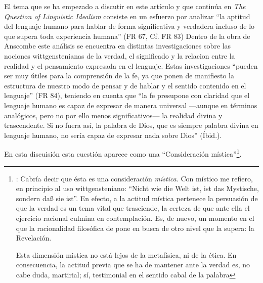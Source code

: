 El tema que se ha empezado a discutir en este artículo y que continúa en \emph{The Question of Linguistic Idealism} consiste en un esfuerzo por analizar \enquote{la aptitud del lenguaje humano para hablar de forma significativa y verdadera incluso de lo que supera toda experiencia humana} (FR 67, Cf. FR 83) Dentro de la obra de Anscombe este análisis se encuentra en distintas investigaciones sobre las nociones wittgenstenianas de la verdad, el significado y la relacion entre la realidad y el pensamiento expresada en el lenguaje.
Estas investigaciones \enquote{pueden ser muy útiles para la comprensión de la fe, ya que ponen de manifiesto la estructura de nuestro modo de pensar y de hablar y el sentido contenido en el lenguaje} (FR 84), teniendo en cuenta que \enquote{la fe presupone con claridad que el lenguaje humano es capaz de expresar de manera universal ---aunque en términos analógicos, pero no por ello menos significativos--- la realidad divina y trascendente. Si no fuera así, la palabra de Dios, que es siempre palabra divina en lenguaje humano, no sería capaz de expresar nada sobre Dios} (Íbid.).

En esta discuisión esta cuestión aparece como una ``Consideración mística''\footnote{\Cite[357]{}: Cabría decir que ésta es una consideración \emph{mística}. Con místico me refiero, en principio al uso wittgensteniano: ``Nicht wie die Welt ist, ist das Mystische, sondern daß sie ist''. En efecto, a la actitud mística pertenece la persuasión de que la verdad es un tema vital que trasciende, la certeza de que ante ella el ejercicio racional culmina en contemplación. Es, de nuevo, un momento en el que la racionalidad filosófica de pone en busca de otro nivel que la supera: la Revelación.

Esta dimensión mistica no está lejos de la metafísica, ni de la ética. \textelp{} En consecuencia, la actitud previa que se ha de mantener ante la verdad es, no cabe duda, martirial; sí, testimonial en el sentido cabal de la palabra}.





